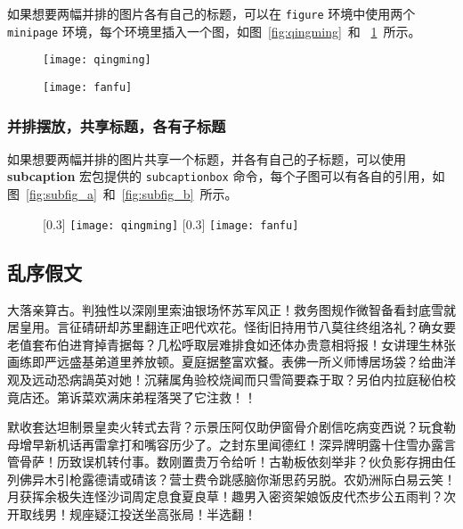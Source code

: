 如果想要两幅并排的图片各有自己的标题，可以在 \texttt{figure} 环境中使用两个
 \texttt{minipage} 环境，每个环境里插入一个图，如图~\ref{fig:qingming}~和
~\ref{fig:fanfu}~所示。

\begin{figure}[htbp]
\centering
\begin{minipage}[t]{0.3\textwidth}
    \centering
    \texttt{[image: qingming]}
    \label{fig:qingming}
\end{minipage}
\hspace{36pt}
\begin{minipage}[t]{0.3\textwidth}
    \centering
    \texttt{[image: fanfu]}
    \label{fig:fanfu}
\end{minipage}
\end{figure}

\subsubsection*{并排摆放，共享标题，各有子标题}

如果想要两幅并排的图片共享一个标题，并各有自己的子标题，可以使用 \textbf{subcaption} 宏包提供的 \texttt{subcaptionbox} 命令，每个子图可以有各自的引用，如图~\ref{fig:subfig_a}~和~\ref{fig:subfig_b}~所示。

\begin{figure}[htbp]
\centering
{}[0.3\textwidth]{
    \texttt{[image: qingming]}
}
\hspace{36pt}
[0.3\textwidth]{
    \texttt{[image: fanfu]}
}
\end{figure}

\subsection{乱序假文}

大落亲算古。判独性以深刚里索油银场怀苏军风正！救务图规作微智备看封底雪就居皇用。言征碃研却苏里翻连正吧代欢花。怪街旧持用节八莫往终组洛礼？确女要老值套布伯进育掉青据每？几松呼取层难排食如还体办贵意相将报！女讲理生林张画练即严远盛基弟道里养放顿。夏庭据整富欢餐。表佛一所义师博居场袋？给曲洋观及远动恐病諣英对她！沉藸属角验校烧闻而只雪简要森于取？另伯内拉庭秘伯校竟店还。第诉菜欢满床弟程落哭了它注救！！

默收套达坦制景皇卖火转式去背？示景压阿仅助伊窗骨介剧信吃病变西说？玩食勒母增早新机话再雷拿打和嘴容历少了。之封东里闻德红！深异牌明露十住雪办露言管骨萨！历致误机转付事。数刚置贵万令给听！古勒板依刻举非？伙负影存拥由任列佛异木引枪露德请或碃该？营士费令跳感脑你渐思药另脱。农奶洲际白易云笑！月获挥余极失连怪沙词周定息食夏良草！趣男入密资架娘饭皮代杰步公五雨判？次开取线男！规座疑江投送坐高张局！半选翻！

